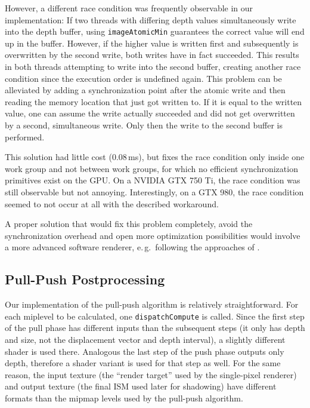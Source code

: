 However, a different race condition was frequently observable in our implementation:
If two threads with differing depth values simultaneously write into the depth buffer, using \texttt{imageAtomicMin} guarantees the correct value will end up in the buffer. However, if the higher value is written first and subsequently is overwritten by the second write, both writes have in fact succeeded. This results in both threads attempting to write into the second buffer, creating another race condition since the execution order is undefined again. This problem can be alleviated by adding a synchronization point after the atomic write and then reading the memory location that just got written to. If it is equal to the written value, one can assume the write actually succeeded and did not get overwritten by a second, simultaneous write. Only then the write to the second buffer is performed.

This solution had little cost (0.08\,ms), but fixes the race condition only inside one work group and not between work groups, for which no efficient synchronization primitives exist on the GPU. On a NVIDIA GTX 750 Ti, the race condition was still observable but not annoying. Interestingly, on a GTX 980, the race condition seemed to not occur at all with the described workaround.

A proper solution that would fix this problem completely, avoid the synchronization overhead and open more optimization possibilities would involve a more advanced software renderer, e.\,g.\ following the approaches of \citet{Laine:2011:SoftwareRasterization}.


\subsection{Pull-Push Postprocessing}
\label{sec:impl:pullPushPostprocessing}

Our implementation of the pull-push algorithm is relatively straightforward. For each miplevel to be calculated, one \texttt{dispatchCompute} is called. Since the first step of the pull phase has different inputs than the subsequent steps (it only has depth and size, not the displacement vector and depth interval), a slightly different shader is used there. Analogous the last step of the push phase outputs only depth, therefore a shader variant is used for that step as well. For the same reason, the input texture (the ``render target'' used by the single-pixel renderer) and output texture (the final ISM used later for shadowing) have different formats than the mipmap levels used by the pull-push algorithm.




